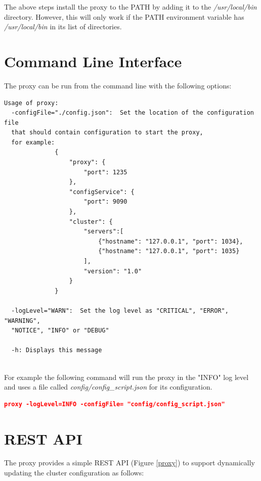 \documentclass[a4paper,11pt,twoside]{report}
\begin{document}
\noindent
The above steps install the proxy to the PATH by adding it to the \textit{/usr/local/bin} directory. However, this will only work if the PATH environment variable has \textit{/usr/local/bin} in its list of directories. 

\section{Command Line Interface}
The proxy can be run from the command line with the following options:\bigskip

\begin{lstlisting}[language=terminal]
Usage of proxy:
  -configFile="./config.json":  Set the location of the configuration file 
  that should contain configuration to start the proxy, 
  for example:
              {
                  "proxy": {
                      "port": 1235
                  },
                  "configService": {
                      "port": 9090
                  },
                  "cluster": {
                      "servers":[
                          {"hostname": "127.0.0.1", "port": 1034},
                          {"hostname": "127.0.0.1", "port": 1035}
                      ],
                      "version": "1.0"
                  }
              }

  -logLevel="WARN":  Set the log level as "CRITICAL", "ERROR", "WARNING", 
  "NOTICE", "INFO" or "DEBUG"

  -h: Displays this message
\end{lstlisting} 

\noindent\\
For example the following command will run the proxy in the "INFO" log level and uses a file called \textit{config/config\_script.json} for its configuration. 

\begin{lstlisting}[language=json]
proxy -logLevel=INFO -configFile= "config/config_script.json" 
\end{lstlisting}
 
\section{REST API}
The proxy provides a simple REST API (Figure \ref{proxy}) to support dynamically updating the cluster configuration as follows:
\end{document}
